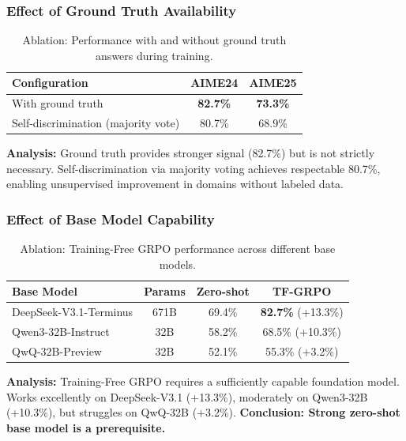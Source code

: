 \subsubsection{Effect of Ground Truth Availability}

\begin{table}[h]
\centering
\caption{Ablation: Performance with and without ground truth answers during training.}
\label{tab:groundtruth}
\begin{tabular}{@{}lcc@{}}
\toprule
\textbf{Configuration} & \textbf{AIME24} & \textbf{AIME25} \\
\midrule
With ground truth & \textbf{82.7\%} & \textbf{73.3\%} \\
Self-discrimination (majority vote) & 80.7\% & 68.9\% \\
\bottomrule
\end{tabular}
\end{table}

\textbf{Analysis:} Ground truth provides stronger signal (82.7\%) but is not strictly necessary. Self-discrimination via majority voting achieves respectable 80.7\%, enabling unsupervised improvement in domains without labeled data.

\subsubsection{Effect of Base Model Capability}

\begin{table}[h]
\centering
\caption{Ablation: Training-Free GRPO performance across different base models.}
\label{tab:models}
\begin{tabular}{@{}lccc@{}}
\toprule
\textbf{Base Model} & \textbf{Params} & \textbf{Zero-shot} & \textbf{TF-GRPO} \\
\midrule
DeepSeek-V3.1-Terminus & 671B & 69.4\% & \textbf{82.7\%} (+13.3\%) \\
Qwen3-32B-Instruct & 32B & 58.2\% & 68.5\% (+10.3\%) \\
QwQ-32B-Preview & 32B & 52.1\% & 55.3\% (+3.2\%) \\
\bottomrule
\end{tabular}
\end{table}

\textbf{Analysis:} Training-Free GRPO requires a sufficiently capable foundation model. Works excellently on DeepSeek-V3.1 (+13.3\%), moderately on Qwen3-32B (+10.3\%), but struggles on QwQ-32B (+3.2\%). \textbf{Conclusion: Strong zero-shot base model is a prerequisite.}

